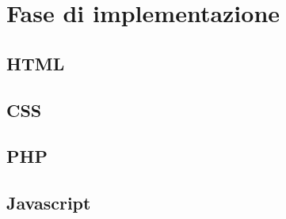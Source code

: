 \section{Fase di implementazione}
\label{sec:fase_di_implementazione}
\subsection{HTML}
\subsection{CSS}
\subsection{PHP}
\subsection{Javascript}

